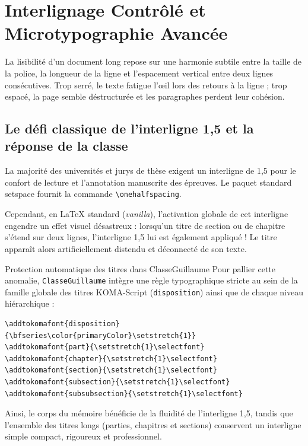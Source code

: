 \section{Interlignage Contrôlé et Microtypographie Avancée}
\label{sec:interlignes_microtype}

La lisibilité d'un document long repose sur une harmonie subtile entre la taille de la police, la longueur de la ligne et l'espacement vertical entre deux lignes consécutives.
Trop serré, le texte fatigue l'œil lors des retours à la ligne ; trop espacé, la page semble déstructurée et les paragraphes perdent leur cohésion.

\subsection{Le défi classique de l'interligne 1,5 et la réponse de la classe}
\label{subsec:defi_interligne}

La majorité des universités et jurys de thèse exigent un interligne de 1,5 pour le confort de lecture et l'annotation manuscrite des épreuves.
Le paquet standard \textsf{setspace} fournit la commande \texttt{\textbackslash onehalfspacing}.

Cependant, en \LaTeX{} standard (\emph{vanilla}), l'activation globale de cet interligne engendre un effet visuel désastreux :
lorsqu'un titre de section ou de chapitre s'étend sur deux lignes, l'interligne 1,5 lui est également appliqué !
Le titre apparaît alors artificiellement distendu et déconnecté de son texte.

\begin{boiteSynthese}{Protection automatique des titres dans ClasseGuillaume}
  Pour pallier cette anomalie, \texttt{ClasseGuillaume} intègre une règle typographique stricte au sein de la famille globale des titres KOMA-Script (\texttt{disposition}) ainsi que de chaque niveau hiérarchique :
  \begin{verbatim}
\addtokomafont{disposition}{\bfseries\color{primaryColor}\setstretch{1}}
\addtokomafont{part}{\setstretch{1}\selectfont}
\addtokomafont{chapter}{\setstretch{1}\selectfont}
\addtokomafont{section}{\setstretch{1}\selectfont}
\addtokomafont{subsection}{\setstretch{1}\selectfont}
\addtokomafont{subsubsection}{\setstretch{1}\selectfont}
  \end{verbatim}
  Ainsi, le corps du mémoire bénéficie de la fluidité de l'interligne 1,5, tandis que l'ensemble des titres longs (parties, chapitres et sections) conservent un interligne simple compact, rigoureux et professionnel.
\end{boiteSynthese}

